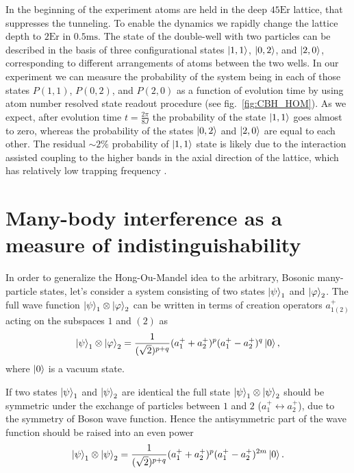 In the beginning of the experiment atoms are held in the deep $45 \textrm{Er}$ lattice, that suppresses  the tunneling. To enable the dynamics we rapidly change the lattice depth to $2\textrm{Er}$ in $0.5\textrm{ms}$. The state of the double-well with two particles can be described in the basis of three configurational states $\left|1,1\right\rangle$, $\left|0,2\right\rangle$, and $\left|2,0\right\rangle$, corresponding to different arrangements of atoms between the two wells. In our experiment we can measure the probability of the system being in each of those states $P(1,1)$, $P(0,2)$, and $P(2,0)$ as a function of evolution time by using atom number resolved state readout procedure (see fig.~\ref{fig:CBH_HOM}). As we expect, after evolution time $t= \frac{2 \pi}{8J}$ the probability of the state $\left|1,1\right\rangle$ goes almost to zero, whereas the probability of the states $\left|0,2\right\rangle$ and $\left|2,0\right\rangle$ are equal to each other. The residual $\sim 2\%$ probability of $\left|1,1\right\rangle$ state is likely due to the interaction assisted coupling to the higher bands in the axial direction of the lattice, which has relatively low trapping frequency \cite{Preiss thesis}. 

\section{Many-body interference as a measure of indistinguishability}
In order to generalize the Hong-Ou-Mandel idea to the arbitrary, Bosonic many-particle states, let's consider a system consisting of two states $\left|\psi\right\rangle_1$ and $\left|\varphi\right\rangle_2$. The full wave function $\left|\psi\right\rangle_1 \otimes \left|\varphi\right\rangle_2$ can be written in terms of creation operators $a_{1(2)}^+$ acting on the subspaces $1$ and $(2)$ as
\begin{equation}
\left|\psi\right\rangle_1 \otimes \left|\varphi\right\rangle_2 = \frac{1}{(\sqrt{2})^{p+q}}(a^+_1 + a^+_2)^p(a^+_1 - a^+_2)^q\left|0\right\rangle,
\end{equation}
where $\left|0\right\rangle$ is a vacuum state.

If two states $\left|\psi\right\rangle_1$ and $\left|\psi\right\rangle_2$ are identical the full state $\left|\psi\right\rangle_1 \otimes \left|\psi\right\rangle_2$ should be symmetric under the exchange of particles between $1$ and $2$ ($a_{1}^+ \leftrightarrow a_2^+$), due to the symmetry of Boson wave function. Hence the antisymmetric part of the wave function should be raised into an even power
\begin{equation}
\left|\psi\right\rangle_1 \otimes \left|\psi\right\rangle_2 = \frac{1}{(\sqrt{2})^{p+q}}(a^+_1 + a^+_2)^p(a^+_1 - a^+_2)^{2m}\left|0\right\rangle.
\end{equation}

